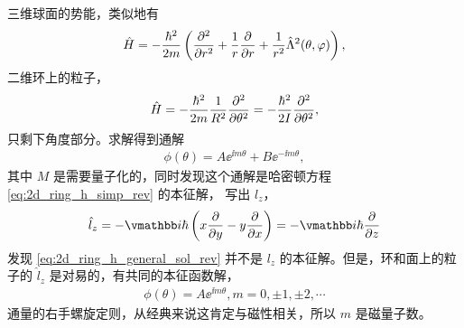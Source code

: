三维球面的势能，类似地有
\begin{align}
    \hat H = - \frac{\hbar^2}{2m} \left(
        \pdv[2]{r} + \frac1r \pdv{r} + \frac1{r^2} \hat\Lambda^2(\theta,\varphi)
    \right), 
\end{align}
二维环上的粒子，
\begin{align}
    \hat H = - \frac{\hbar^2}{2m} \frac1{R^2} \pdv[2]{\theta} = - \frac{\hbar^2}{2I} \pdv[2]{\theta}, \label{eq:2d_ring_h_simp_rev}
\end{align}
只剩下角度部分。求解得到通解
\begin{align}
    \phi(\theta) = A \ee^{\ii m\theta} + B \ee^{-\ii m \theta},\label{eq:2d_ring_h_general_sol_rev}
\end{align}
其中 $M$ 是需要量子化的，同时发现这个通解是哈密顿方程 \eqref{eq:2d_ring_h_simp_rev} 的本征解，
写出 $l_z$，
\begin{align}
    \hat l_z = - \ii\hbar \left(
        x \pdv{y} - y \pdv{x}
    \right) = -\ii\hbar \pdv{z}
\end{align}
发现 \eqref{eq:2d_ring_h_general_sol_rev} 并不是 $l_z$ 的本征解。但是，环和面上的粒子的 $\hat l_z$ 是对易的，有共同的本征函数解，
\begin{align}
    \phi(\theta) = A\ee^{\ii m \theta}, m = 0,\pm1,\pm2,\cdots
\end{align}
通量的右手螺旋定则，从经典来说这肯定与磁性相关，所以 $m$ 是磁量子数。


